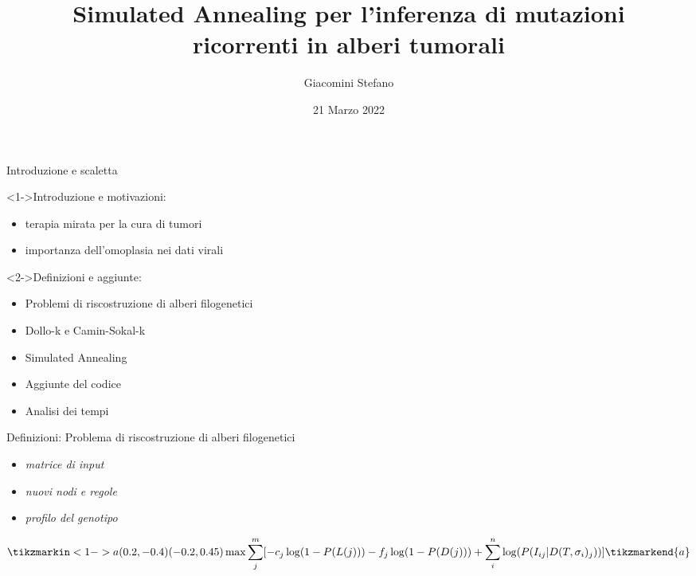 \documentclass{beamer}
\author{Giacomini Stefano}
\title{Simulated Annealing per l'inferenza di mutazioni\\ ricorrenti in alberi tumorali}
\date{21 Marzo 2022}
\begin{document}
\titlepageframe

\begin{tframe}{Introduzione e scaletta}
  \begin{block}<1->{Introduzione e motivazioni:}
    \begin{itemize}
      \item terapia mirata per la cura di tumori
      \item importanza dell'omoplasia nei dati virali
    \end{itemize}
  \end{block}
  \begin{block}<2->{{Definizioni e aggiunte:}}
    \begin{itemize}
      \item Problemi di riscostruzione di alberi filogenetici
      \item Dollo-k e Camin-Sokal-k
      \item Simulated Annealing
      \item Aggiunte del codice
      \item Analisi dei tempi
    \end{itemize}
  \end{block}
\end{tframe}

\begin{tframe}{Definizioni: Problema di riscostruzione di alberi filogenetici}
    \vspace{5mm}
    \begin{itemize}
      \item \textit{matrice di input}
      \item \textit{nuovi nodi e regole}
      \item \textit{profilo del genotipo}
    \end{itemize}

    \vspace{10mm}
    \tiny
    \begin{equation*}
      \tikzmarkin<1->{a}(0.2,-0.4)(-0.2,0.45)
        \max{\sum_{j}^{m}[-c_{j}\log(1-P(L(j)))-f_{j}\log(1-P(D(j)))+\sum_{i}^{n}\log(P(I_{ij}|D(T, \sigma_{i})_{j}))]}
      \tikzmarkend{a}
    \end{equation*}
\end{tframe}
\end{document}

